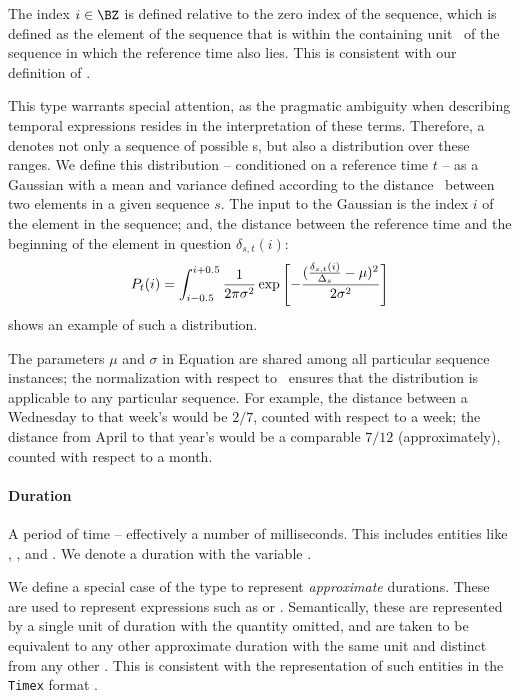 The index $i \in \BZ$ is defined relative to the zero index of the sequence,
	which is defined as the element of the sequence
	that is within the containing unit \seqcanon\ of the sequence in which the 
	reference time also lies.
This is consistent with our definition of \seqelem.

This type warrants special attention, as the pragmatic ambiguity when
	describing temporal expressions resides in the interpretation of these
	terms.
Therefore, a  denotes not only a sequence of possible
	s, but also a distribution over these ranges.
We define this distribution -- conditioned on a reference time $t$ --
	as a Gaussian with a mean and variance defined according
	to the distance \seqjump\ between two elements in a given sequence $s$.
The input to the Gaussian is the index $i$ of the element in the sequence;
	and, the distance between the reference time and the beginning
	of the element in question $\delta_{s,t}(i)$:
\begin{equation}
\label{eqn:gaussian}
	P_t(i) = 
	\int_{i-0.5}^{i+0.5}
		\frac{1}{2\pi\sigma^2} 
			\exp\left[-\frac{
					(\frac{\delta_{s,t}(i)}{\Delta_s} - \mu)^2
				}{
					2\sigma^2
				}
			\right]
\end{equation}
\needfig shows an example of such a distribution.

The parameters $\mu$ and $\sigma$ in Equation  are shared
	among all particular sequence instances; the normalization
	with respect to \seqjump\ ensures that the distribution is applicable
	to any particular sequence.
For example, the distance between a Wednesday to that week's 
	would be $2/7$, counted with respect to a week; 
	the distance from April to that year's  would be a 
	comparable $7/12$ (approximately), counted with respect to a month.
	
\paragraph{Duration}
A period of time -- effectively a number of milliseconds.
This includes entities like , , and .
We denote a duration with the variable \dur.

We define a special case of the  type to represent 
	\textit{approximate} durations.
These are used to represent expressions such as  or
	.
Semantically, these are represented by a single unit of duration with the
	quantity omitted, and are taken to be equivalent to any other approximate
	duration with the same unit and distinct from any other .
This is consistent with the representation of such entities in the
	\texttt{Timex} format \needcite.

